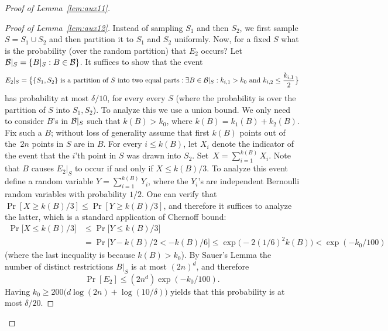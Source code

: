 \documentclass{article}
\newcommand{\B}{{\cal B}}
\newcommand{\samp}{S}
\begin{document}
\begin{proof}[Proof of Lemma~\ref{lem:aux11}]
\begin{proof}[Proof of Lemma~\ref{lem:aux12}]
Instead of sampling $\samp_1$ and then $\samp_2$,
we first sample $\samp=\samp_1\cup \samp_2$ and 
then partition it to $\samp_1$ and $\samp_2$ uniformly.
Now, for a fixed $\samp$ what is the probability (over the random partition)
that $E_2$ occurs?
Let $\B|_{\samp} = \{B|_{\samp} : B\in\B\}$.
It suffices to show that the event
\[E_2|_{\samp} = 
\bigl\{ \{S_1,S_2\}\text{ is a partition of $S$ into two equal parts} :
\exists {B\in\B|_{\samp}}:
  k_{i,1}>k_0 \mbox{ and } k_{i,2} \leq \frac{k_{i,1}}{2}
  \bigr\}
\]
has probability at most $\delta/10$, for every every $\samp$ 
(where the probability is over the partition of $\samp$ into $\samp_1,\samp_2$).
To analyze this we use a union bound. 
We only need to consider $B$'s in $\B|_{\samp}$ such that $k(B) > k_0$,
where $k(B) = k_{1}(B)+ k_{2}(B)$.
Fix such a $B$;
without loss of generality assume that
first $k(B)$ points out of the~$2n$
points in $S$ are in $B$. 
For every $i\leq k(B)$,
let $X_i$ denote the indicator of the event
that the $i$'th point in $S$ was drawn into $S_2$.
Set~$X=\sum_{i=1}^{k(B)}X_i$.
Note that $B$ causes $E_2|_{\samp}$ to occur if and only if $X\leq k(B)/3$.
To analyze this event define a random variable $Y=\sum_{i=1}^{k(B)}Y_i$,
where the $Y_i$'s are independent Bernoulli random variables with probability $1/2$.
One can verify that $\Pr[X\geq k(B)/3]\leq \Pr[Y\geq k(B)/3]$,
and therefore it suffices to analyze the latter, 
which is a standard application of Chernoff bound:
\begin{align*}
\Pr\bigl[X\leq k(B)/3\bigr]&\leq 
\Pr\bigl[Y\leq k(B)/3\bigr]\\
&=\Pr\bigl[Y- k(B)/2 < -k(B)/6\bigr]\leq
\exp\bigl(-2(1/6)^2k(B)\bigr) < \exp(-k_0/100)
\end{align*}
(where the last inequality is because $k(B) > k_0$).
By Sauer's Lemma
the number of distinct restrictions $B|_S$ is at most $(2n)^d$, and therefore 
\[\Pr[E_2]\leq (2n^d)\exp(-k_0/100).\]
Having $k_0\geq 200\bigl(d\log(2n) + \log(10/\delta)\bigr)$ yields
that this probability is at most $\delta/20$.
\end{proof}


\end{proof}
\end{document}
